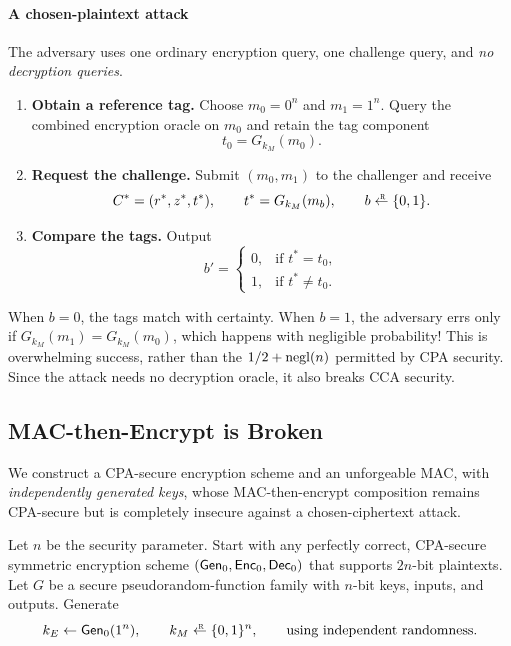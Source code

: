 \paragraph{A chosen-plaintext attack}
The adversary uses one ordinary encryption query, one challenge query, and
\emph{no decryption queries}.

\begin{enumerate}
  \item \textbf{Obtain a reference tag.}
    Choose $m_0=0^n$ and $m_1=1^n$. Query the combined encryption oracle on
    $m_0$ and retain the tag component
    \[
      t_0=G_{k_M}(m_0).
    \]
  \item \textbf{Request the challenge.}
    Submit $(m_0,m_1)$ to the challenger and receive
    \[
      C^*=(r^*,z^*,t^*),
      \qquad t^*=G_{k_M}(m_b),
      \qquad b\getsr\bits.
    \]
  \item \textbf{Compare the tags.} Output
    \[
      b'=\begin{cases}
        0,&\text{if }t^*=t_0,\\
        1,&\text{if }t^*\ne t_0.
      \end{cases}
    \]
\end{enumerate}

When $b=0$, the tags match with certainty. When $b=1$, the adversary errs
only if $G_{k_M}(m_1)=G_{k_M}(m_0)$, which happens with negligible probability!
This is overwhelming success, rather than the $1/2+\operatorname{negl}(n)$ permitted by
CPA security. Since the attack needs no decryption oracle, it also breaks
CCA security.

\subsection{MAC-then-Encrypt is Broken}

We construct a CPA-secure encryption scheme and an unforgeable MAC,
with \emph{independently generated keys}, whose MAC-then-encrypt composition
remains CPA-secure but is completely insecure against a chosen-ciphertext
attack.

Let $n$ be the security parameter. Start with any perfectly correct,
CPA-secure symmetric encryption scheme $(\mathsf{Gen}_0,\mathsf{Enc}_0,\mathsf{Dec}_0)$ that
supports $2n$-bit plaintexts. Let $G$ be a secure pseudorandom-function
family with $n$-bit keys, inputs, and outputs. Generate
\[
  k_E\leftarrow\Gen_0(1^n),
  \qquad k_M\getsr\bits^n,
  \qquad\text{using independent randomness.}
\]

